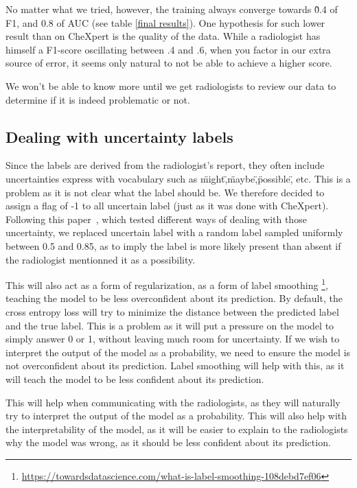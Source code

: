 \documentclass[11pt]{article}
\begin{document}
            No matter what we tried, however, the training always converge towards \~0.4 of F1, and 0.8 of AUC (see table \ref{final results}). One hypothesis for such lower result than on CheXpert is
            the quality of the data. While a radiologist has himself a F1-score oscillating between .4 and .6, when you factor in our extra source of error, it seems only natural to not be able to achieve a higher score.


            We won't be able to know more until we get radiologists to review our data to determine if it is indeed problematic or not.




    \subsection{Dealing with uncertainty labels}



        Since the labels are derived from the radiologist's report, they often include uncertainties express with vocabulary such as \"might\",\"maybe\",\"possible\", etc.
        This is a problem as it is not clear what the label should be. We therefore decided to assign a flag of -1 to all uncertain label (just as it was done with CheXpert). Following this paper~\cite{hierarchical}, which tested different
        ways of dealing with those uncertainty, we replaced uncertain label with a random label sampled uniformly between 0.5 and 0.85, as to imply the label is more likely present than absent if the radiologist
        mentionned it as a possibility.

        This will also act as a form of regularization, as a form of label smoothing \footnote{\url{https://towardsdatascience.com/what-is-label-smoothing-108debd7ef06}}, teaching the model to
        be less overconfident about its prediction. By default, the cross entropy loss will try to minimize the distance between the predicted label and the true label. This is a problem as it will
        put a pressure on the model to simply answer 0 or 1, without leaving much room for uncertainty. If we wish to interpret the
        output of the model as a probability, we need to ensure the model is not overconfident about its prediction. Label smoothing will help with this, as it will teach the model to be less confident about its prediction.

        This will help when communicating with the radiologists, as they will naturally try to interpret the output of the model as a probability. This will also help with the interpretability of the model, as it will
        be easier to explain to the radiologists why the model was wrong, as it should be less confident about its prediction.
\end{document}
